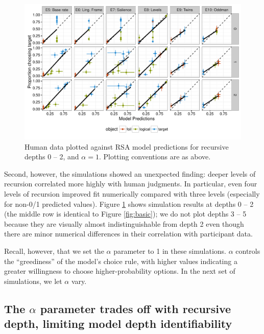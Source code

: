 \documentclass[man,noapacite]{apa2}
\begin{document}
\begin{figure}[t]
 \centering
 \includegraphics[width=6in]{../plots/model_depth.pdf}
 \caption{\label{fig:depths} Human data plotted against RSA model predictions for recursive depths 0 -- 2, and $\alpha=1$. Plotting conventions are as above.}
\end{figure}

Second, however, the simulations showed an unexpected finding: deeper levels of recursion correlated more highly with human judgments. In particular, even four levels of recursion improved fit numerically compared with three levels (especially for non-0/1 predicted values). Figure \ref{fig:depths} shows simulation results at depths 0 -- 2 (the middle row is identical to Figure \ref{fig:basic}); we do not plot depths 3 -- 5 because they are visually almost indistinguishable from depth 2 even though there are minor numerical differences in their correlation with participant data.

Recall, however, that we set the $\alpha$ parameter to 1 in these simulations. $\alpha$ controls the ``greediness'' of the model's choice rule, with higher values indicating a greater willingness to choose higher-probability options. In the next set of simulations, we let $\alpha$ vary.

\subsection{The $\alpha$ parameter trades off with recursive depth, limiting model depth identifiability}
\end{document}

